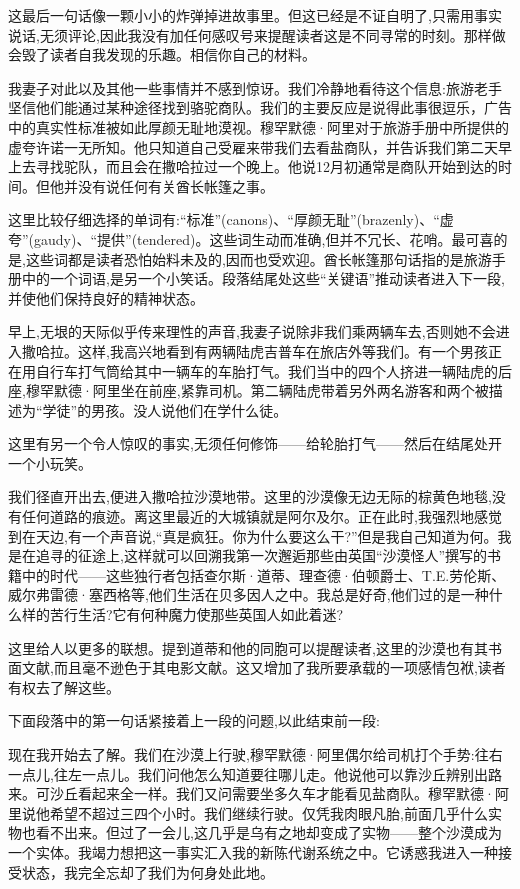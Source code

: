 这最后一句话像一颗小小的炸弹掉进故事里。但这已经是不证自明了,只需用事实说话,无须评论,因此我没有加任何感叹号来提醒读者这是不同寻常的时刻。那样做会毁了读者自我发现的乐趣。相信你自己的材料。

我妻子对此以及其他一些事情并不感到惊讶。我们冷静地看待这个信息:旅游老手坚信他们能通过某种途径找到骆驼商队。我们的主要反应是说得此事很逗乐，广告中的真实性标准被如此厚颜无耻地漠视。穆罕默德·阿里对于旅游手册中所提供的虚夸许诺一无所知。他只知道自己受雇来带我们去看盐商队，并告诉我们第二天早上去寻找驼队，而且会在撒哈拉过一个晚上。他说12月初通常是商队开始到达的时间。但他并没有说任何有关酋长帐篷之事。


这里比较仔细选择的单词有:“标准”(canons)、“厚颜无耻”(brazenly)、“虚夸”(gaudy)、“提供”(tendered)。这些词生动而准确,但并不冗长、花哨。最可喜的是,这些词都是读者恐怕始料未及的,因而也受欢迎。酋长帐篷那句话指的是旅游手册中的一个词语,是另一个小笑话。段落结尾处这些“关键语”推动读者进入下一段,并使他们保持良好的精神状态。

早上,无垠的天际似乎传来理性的声音,我妻子说除非我们乘两辆车去,否则她不会进入撒哈拉。这样,我高兴地看到有两辆陆虎吉普车在旅店外等我们。有一个男孩正在用自行车打气筒给其中一辆车的车胎打气。我们当中的四个人挤进一辆陆虎的后座,穆罕默德·阿里坐在前座,紧靠司机。第二辆陆虎带着另外两名游客和两个被描述为“学徒”的男孩。没人说他们在学什么徒。

这里有另一个令人惊叹的事实,无须任何修饰——给轮胎打气——然后在结尾处开一个小玩笑。

我们径直开出去,便进入撒哈拉沙漠地带。这里的沙漠像无边无际的棕黄色地毯,没有任何道路的痕迹。离这里最近的大城镇就是阿尔及尔。正在此时,我强烈地感觉到在天边,有一个声音说,“真是疯狂。你为什么要这么干?”但是我自己知道为何。我是在追寻的征途上,这样就可以回溯我第一次邂逅那些由英国“沙漠怪人”撰写的书籍中的时代——这些独行者包括查尔斯·道蒂、理查德·伯顿爵士、T.E.劳伦斯、威尔弗雷德·塞西格等,他们生活在贝多因人之中。我总是好奇,他们过的是一种什么样的苦行生活?它有何种魔力使那些英国人如此着迷?

这里给人以更多的联想。提到道蒂和他的同胞可以提醒读者,这里的沙漠也有其书面文献,而且毫不逊色于其电影文献。这又增加了我所要承载的一项感情包袱,读者有权去了解这些。

下面段落中的第一句话紧接着上一段的问题,以此结束前一段:

现在我开始去了解。我们在沙漠上行驶,穆罕默德·阿里偶尔给司机打个手势:往右一点儿,往左一点儿。我们问他怎么知道要往哪儿走。他说他可以靠沙丘辨别出路来。可沙丘看起来全一样。我们又问需要坐多久车才能看见盐商队。穆罕默德·阿里说他希望不超过三四个小时。我们继续行驶。仅凭我肉眼凡胎,前面几乎什么实物也看不出来。但过了一会儿,这几乎是乌有之地却变成了实物——整个沙漠成为一个实体。我竭力想把这一事实汇入我的新陈代谢系统之中。它诱惑我进入一种接受状态，我完全忘却了我们为何身处此地。


